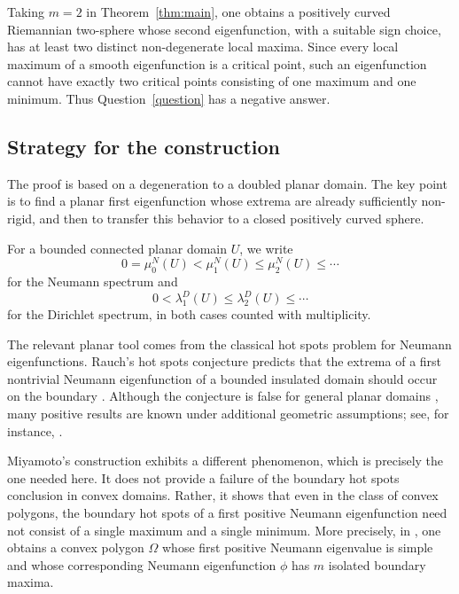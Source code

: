 \documentclass[11pt]{amsart}
\numberwithin{equation}{section}
\newcommand{\Om}{\Omega}
\begin{document}
Taking $m=2$ in Theorem~\ref{thm:main}, one obtains a positively curved
Riemannian two-sphere whose second eigenfunction, with a suitable sign choice,
has at least two distinct non-degenerate local maxima.  Since every local
maximum of a smooth eigenfunction is a critical point, such an eigenfunction
cannot have exactly two critical points consisting of one maximum and one
minimum.  Thus Question~\ref{question} has a negative answer.

\subsection{Strategy for the construction}

The proof is based on a degeneration to a doubled planar domain.  The key point
is to find a planar first eigenfunction whose extrema are already sufficiently
non-rigid, and then to transfer this behavior to a closed positively curved
sphere.

For a bounded connected planar domain $U$, we write
\[
0=\mu_0^N(U)<\mu_1^N(U)\le\mu_2^N(U)\le\cdots
\]
for the Neumann spectrum and
\[
0<\lambda_1^D(U)\le\lambda_2^D(U)\le\cdots
\]
for the Dirichlet spectrum, in both cases counted with multiplicity.

The relevant planar tool comes from the classical hot spots problem for Neumann
eigenfunctions.  Rauch's hot spots conjecture predicts that the extrema of a
first nontrivial Neumann eigenfunction of a bounded insulated domain should occur
on the boundary \cite{Rauch1975}.  Although the conjecture is false for general
planar domains \cite{BurdzyWerner1999,BanuelosBurdzy1999}, many positive results
are known under additional geometric assumptions; see, for instance,
\cite{JerisonNadirashvili2000,AtarBurdzy2004,Pascu2002,Steinerberger2020,JudgeMondal2020,ChenGuiYao2026}.

Miyamoto's construction \cite{MiyamotoJJIAM} exhibits a different phenomenon,
which is precisely the one needed here.  It does not provide a failure of the
boundary hot spots conclusion in convex domains.  Rather, it shows that even in
the class of convex polygons, the boundary hot spots of a first positive Neumann
eigenfunction need not consist of a single maximum and a single minimum.  More
precisely, in \cite[Theorem A]{MiyamotoJJIAM}, one obtains a
convex polygon $\Om$ whose first positive Neumann eigenvalue is simple and whose
corresponding Neumann eigenfunction $\phi$ has $m$ isolated boundary maxima.
\end{document}
